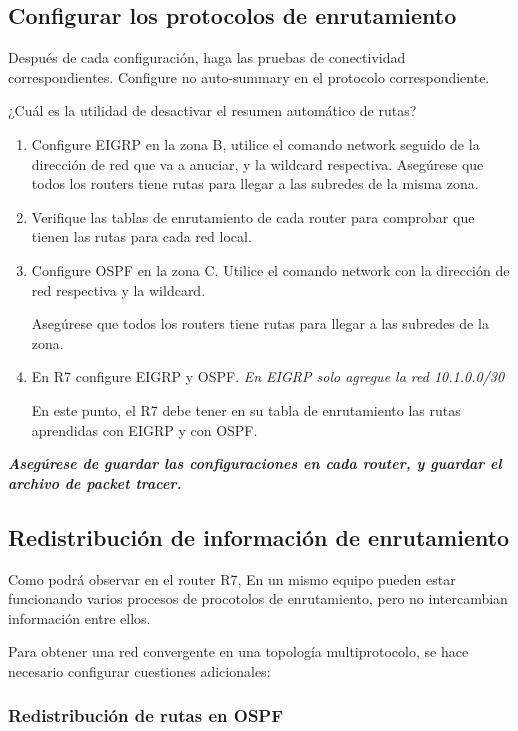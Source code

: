 \documentclass[12pt]{article}
\begin{document}
\subsection{Configurar los protocolos de enrutamiento}
Después de cada configuración, haga las pruebas de conectividad correspondientes.
Configure no auto-summary en el protocolo correspondiente.

¿Cuál es la utilidad de desactivar el resumen automático de rutas?

\begin{enumerate}[label=\Alph*]
\item Configure EIGRP en la zona B, utilice el comando network seguido de la dirección de red que va a anuciar, y la wildcard respectiva. Asegúrese que todos los routers tiene rutas para llegar a las subredes de la misma zona.
\item Verifique las tablas de enrutamiento de cada router para comprobar que tienen las rutas para cada red local.

\item Configure OSPF en la zona C. Utilice el comando network con la dirección de red respectiva y la wildcard.

Asegúrese que todos los routers tiene rutas para llegar a las subredes de la zona. 
\item En R7 configure EIGRP y OSPF. \textit{En EIGRP solo agregue la red 10.1.0.0/30}

En este punto, el R7 debe tener en su tabla de enrutamiento las rutas aprendidas con EIGRP y con OSPF.
\end{enumerate}

\textit{\textbf{Asegúrese de guardar las configuraciones en cada router, y guardar el archivo de packet tracer.}}

\subsection{Redistribución de información de enrutamiento}
Como podrá observar en el router R7, En un mismo equipo pueden estar funcionando varios procesos de procotolos de enrutamiento, pero no intercambian información entre ellos. 

Para obtener una red convergente en una topología multiprotocolo, se hace necesario configurar cuestiones adicionales:

\subsubsection{Redistribución de rutas en OSPF}
\end{document}
